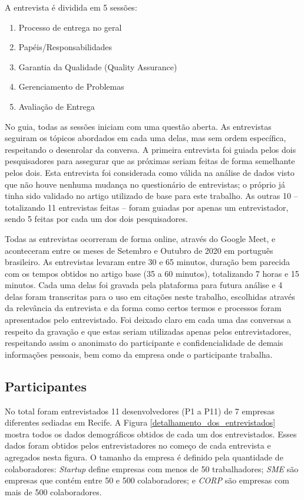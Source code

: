 A entrevista é dividida em 5 sessões: 

\begin{enumerate}
\item Processo de entrega no geral
\item Papéis/Responsabilidades
\item Garantia da Qualidade (Quality Assurance)
\item Gerenciamento de Problemas
\item Avaliação de Entrega
\end{enumerate}

No guia, todas as sessões iniciam com uma questão aberta. As entrevistas seguiram os tópicos abordados em cada uma delas, mas sem ordem específica, respeitando o desenrolar da conversa. A primeira entrevista foi guiada pelos dois pesquisadores para assegurar que as próximas seriam feitas de forma semelhante pelos dois. Esta entrevista foi considerada como válida na análise de dados visto que não houve nenhuma mudança no questionário de entrevistas; o próprio já tinha sido validado no artigo utilizado de base para este trabalho. As outras 10 -- totalizando 11 entrevistas feitas -- foram guiadas por apenas um entrevistador, sendo 5 feitas por cada um dos dois pesquisadores.

Todas as entrevistas ocorreram de forma online, através do Google Meet, e aconteceram entre os meses de Setembro e Outubro de 2020 em português brasileiro. As entrevistas levaram entre 30 e 65 minutos, duração bem parecida com os tempos obtidos no artigo base (35 a 60 minutos), totalizando 7 horas e 15 minutos. Cada uma delas foi gravada pela plataforma para futura análise e 4 delas foram transcritas para o uso em citações neste trabalho, escolhidas através da relevância da entrevista e da forma como certos termos e processos foram apresentados pelo entrevistado. Foi deixado claro em cada uma das conversas a respeito da gravação e que estas seriam utilizadas apenas pelos entrevistadores, respeitando assim o anonimato do participante e confidencialidade de demais informações pessoais, bem como da empresa onde o participante trabalha.

\subsection{Participantes}

No total foram entrevistados 11 desenvolvedores (P1 a P11) de 7 empresas diferentes sediadas em Recife. A Figura \ref{detalhamento_dos_entrevistados} mostra todos os dados demográficos obtidos de cada um dos entrevistados. Esses dados foram obtidos pelos entrevistadores no começo de cada entrevista e agregados nesta figura. O tamanho da empresa é definido pela quantidade de colaboradores: \emph{Startup} define empresas com menos de 50 trabalhadores; \emph{SME} são empresas que contém entre 50 e 500 colaboradores; e \emph{CORP} são empresas com mais de 500 colaboradores.


